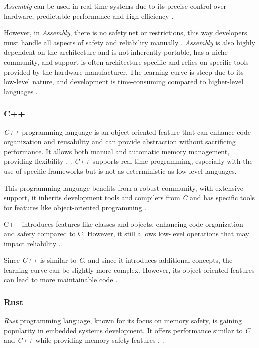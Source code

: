\textit{Assembly} can be used in real-time systems due to its precise control over hardware, predictable performance and high efficiency \cite{LPROG5}.

However, in \textit{Assembly}, there is no safety net or restrictions, this way developers must handle all aspects of safety and reliability manually \cite{LPROG7}.
\textit{Assembly} is also highly dependent on the architecture and is not inherently portable, has a niche community, and support is often architecture-specific and relies on specific tools provided by the hardware manufacturer.
The learning curve is steep due to its low-level nature, and development is time-consuming compared to higher-level languages \cite{LPROG5}.

\subsubsection{C++}
\textit{C++} programming language is an object-oriented feature that can enhance code organization and reusability and can provide abstraction without sacrificing performance.
It allows both manual and automatic memory management, providing flexibility \cite{LPROG2}, \cite{LPROG6}.
\textit{C++} supports real-time programming, especially with the use of specific frameworks but is not as deterministic as low-level languages.

This programming language benefits from a robust community, with extensive support, it inherits development tools and compilers from \textit{C} and has specific tools for features like object-oriented programming \cite{LPROG7}.

C++ introduces features like classes and objects, enhancing code organization and safety compared to C.
However, it still allows low-level operations that may impact reliability \cite{LPROG5}.

Since \textit{C++} is similar to \textit{C}, and since it introduces additional concepts, the learning curve can be slightly more complex.
However, its object-oriented features can lead to more maintainable code \cite{LPROG7}.

\subsubsection{Rust}
\textit{Rust} programming language, known for its focus on memory safety, is gaining popularity in embedded systems development.
It offers performance similar to \textit{C} and \textit{C++} while providing memory safety features \cite{LPROG2},\cite{LPROG7} .

